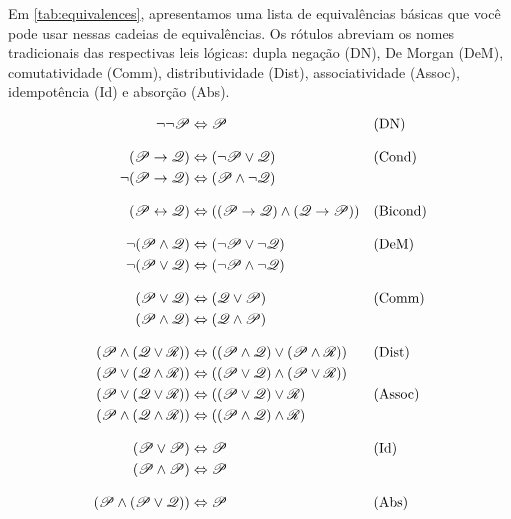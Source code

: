 Em \cref{tab:equivalences}, apresentamos uma lista de equivalências básicas que você pode usar nessas cadeias de equivalências. Os rótulos abreviam os nomes tradicionais das respectivas leis lógicas: dupla negação (DN), De Morgan (DeM), comutatividade (Comm), distributividade (Dist), associatividade (Assoc), idempotência (Id) e absorção (Abs).

\begin{table}
	\begin{align*}
\lnot\lnot \metav{P} & \Leftrightarrow \metav{P} && \text{(DN)}\\[2ex]
(\metav{P} \eif \metav{Q}) & \Leftrightarrow (\lnot \metav{P} \lor \metav{Q})
&& \text{(Cond)}\\
\lnot(\metav{P} \eif \metav{Q}) & \Leftrightarrow (\metav{P} \land \lnot\metav{Q}) \\[2ex]
(\metav{P} \eiff \metav{Q}) & \Leftrightarrow ((\metav{P} \eif \metav{Q}) \land  (\metav{Q} \eif \metav{P}))
&& \text{(Bicond)}\\[2ex]
\lnot(\metav{P} \land \metav{Q}) & \Leftrightarrow (\lnot\metav{P} \lor \lnot\metav{Q})
&& \text{(DeM)}\\
\lnot(\metav{P} \lor \metav{Q}) & \Leftrightarrow (\lnot\metav{P} \land \lnot\metav{Q}) \\[2ex]
(\metav{P} \lor \metav{Q}) & \Leftrightarrow (\metav{Q} \lor \metav{P}) & &\text{(Comm)}\\
(\metav{P} \land \metav{Q}) & \Leftrightarrow (\metav{Q} \land \metav{P})\\[2ex]
(\metav{P} \land (\metav{Q} \lor \metav{R})) & \Leftrightarrow ((\metav{P} \land \metav{Q}) \lor (\metav{P} \land \metav{R}))
&& \text{(Dist)}\\
(\metav{P} \lor (\metav{Q} \land \metav{R})) & \Leftrightarrow ((\metav{P} \lor \metav{Q}) \land (\metav{P} \lor \metav{R}))\\
(\metav{P} \lor (\metav{Q} \lor \metav{R})) & \Leftrightarrow ((\metav{P} \lor \metav{Q}) \lor \metav{R}) & &\text{(Assoc)}\\
(\metav{P} \land (\metav{Q} \land \metav{R})) & \Leftrightarrow ((\metav{P} \land \metav{Q}) \land \metav{R})\\[2ex]
(\metav{P} \lor \metav{P}) & \Leftrightarrow \metav{P} && \text{(Id)}\\
(\metav{P} \land \metav{P}) & \Leftrightarrow \metav{P}\\[2ex]
(\metav{P} \land (\metav{P} \lor \metav{Q})) & \Leftrightarrow \metav{P}&& \text{(Abs)}\\

\end{align*}
\end{table}

